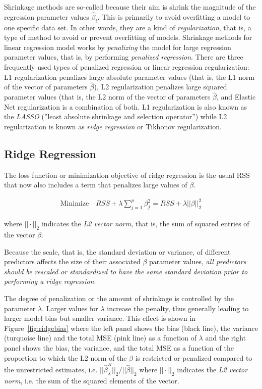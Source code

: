 Shrinkage methods are so-called because their aim is shrink the magnitude of the regression parameter values $\hat{\beta}_i$. This is primarily to avoid overfitting a model to one specific data set. In other words, they are a kind of \emph{regularization}, that is, a type of method to avoid or prevent overfitting of models. Shrinkage methods for linear regression model works by \emph{penalizing} the model for large regression parameter values, that is, by performing \emph{penalized regression}. There are three frequently used types of penalized regression or linear regression regularization: L1 regularization penalizes large absolute parameter values (that is, the L1 norm of the vector of parameters $\hat{\beta}$), L2 regularization penalizes large squared parameter values (that is, the L2 norm of the vector of parameters $\hat{\beta}$, and Elastic Net regularization is a combination of both. L1 regularization is also known as the \emph{LASSO} (''least absolute shrinkage and selection operator'') while L2 regularization is known as \emph{ridge regression} or Tikhonov regularization. 

\subsection{Ridge Regression}

The loss function or minimization objective of ridge regression is the usual RSS that now also includes a term that penalizes large values of $\beta$. 

\begin{align*}
\text{Minimize} \quad RSS + \lambda \sum_{j=1}^p \beta_j^2 = RSS + \lambda ||\beta||_2^2
\end{align*}

\noindent where $||\cdot||_2$ indicates the \emph{L2 vector norm}, that is, the sum of squared entries of the vector $\beta$. 

Because the scale, that is, the standard deviation or variance, of different predictors affects the size of their associated $\beta$ parameter values, \emph{all predictors should be rescaled or standardized to have the same standard deviation prior to performing a ridge regression}. 

The degree of penalization or the amount of shrinkage is controlled by the parameter $\lambda$. Larger values for $\lambda$ increase the penalty, thus generally leading to larger model bias but smaller variance. This effect is shown in Figure~\ref{fig:ridgebias} where the left panel shows the bias (black line), the variance (turquoise line) and the total MSE (pink line) as a function of $\lambda$ and the right panel shows the bias, the variance, and the total MSE as a function of the proportion to which the L2 norm of the $\beta$ is restricted or penalized compared to the unrestricted estimates, i.e. $||\hat{\beta}^R_\lambda||_2 / ||\hat{\beta}||_2$ where $||\cdot||_2$ indicates the \emph{L2 vector norm}, i.e. the sum of the squared elements of the vector.

